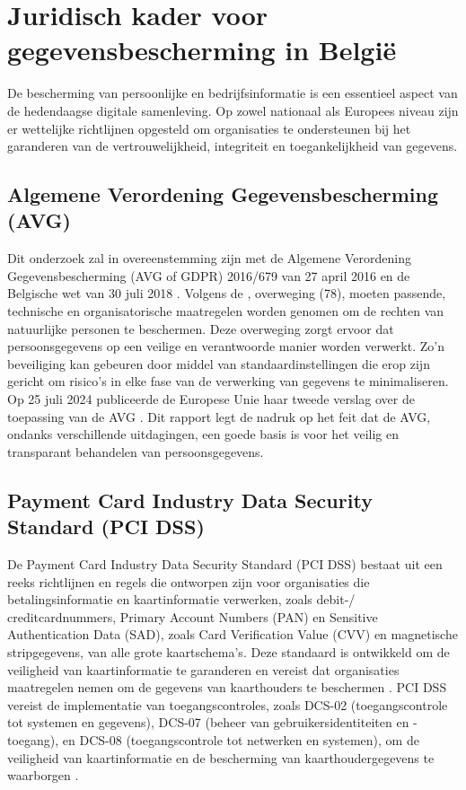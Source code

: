 \section{Juridisch kader voor gegevensbescherming in België}%

De bescherming van persoonlijke en bedrijfsinformatie is een essentieel aspect van de hedendaagse digitale samenleving. 
Op zowel nationaal als Europees niveau zijn er wettelijke richtlijnen opgesteld om organisaties te ondersteunen bij het garanderen van de vertrouwelijkheid, 
integriteit en toegankelijkheid van gegevens.

\subsection{Algemene Verordening Gegevens\-besch\-erming (AVG)}%

Dit onderzoek zal in overeenstemming zijn met de Algemene Verordening Gegevensbescherming (AVG of GDPR) 2016/679 van 27 april 2016 \autocite{eu_avg2016} en de Belgische wet van 30 juli 2018 \autocite{BelgischeOverheid2018}.
Volgens de \textcite{eu_avg2016}, overweging (78), moeten passende, technische en organisatorische maatregelen worden genomen om de rechten van natuurlijke personen te beschermen. 
Deze overweging zorgt ervoor dat persoonsgegevens op een veilige en verantwoorde manier worden verwerkt. 
Zo'n beveiliging kan gebeuren door middel van standaardinstellingen die erop zijn gericht om risico's in elke fase van de verwerking van gegevens te minimaliseren.
Op 25 juli 2024 publiceerde de Europese Unie haar tweede verslag over de toepassing van de AVG \autocite{eu_avg2024}. 
Dit rapport legt de nadruk op het feit dat de AVG, ondanks verschillende uitdagingen, een goede basis is voor het veilig en transparant behandelen van persoonsgegevens. 


\subsection{Payment Card Industry Data Security Standard (PCI DSS)}%

De Payment Card Industry Data Security Stand\-ard (PCI DSS) bestaat uit een reeks richtlijnen en regels die ontworpen zijn voor organisaties die betalingsinformatie en kaartinformatie verwerken, 
zoals debit-/ creditcardnummers, Primary Account Numbers (PAN) en Sensitive Authentication Data (SAD), zoals Card Verification Value (CVV) en magnetische stripgegevens, van alle grote kaartsche\-ma's. 
Deze standaard is ontwikkeld om de veiligheid van kaartinformatie te garanderen en vereist dat organisaties maatregelen nemen om de gegevens van kaarthouders te beschermen \autocite{Elluri2018}. 
PCI DSS vereist de implementatie van toegangscontroles, zoals DCS-02 (toegangscontrole tot systemen en gegevens), DCS-07 (beheer van gebruikersidentiteiten en -toegang), 
en DCS-08 (toegangscontrole tot netwerken en systemen), om de veiligheid van kaartinformatie en de bescherming van kaarthoudergegevens te waarborgen \autocite{Elluri2018}.

